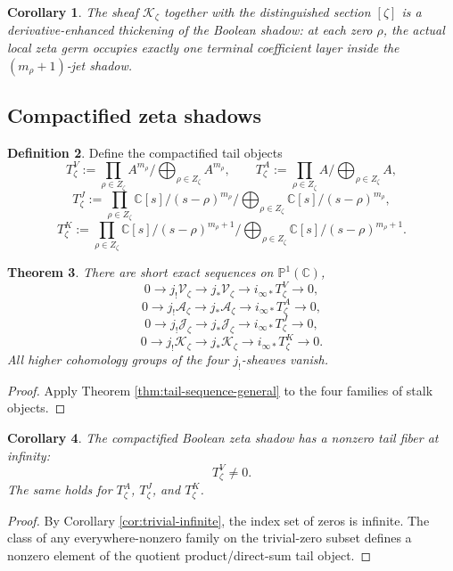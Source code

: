\documentclass[11pt,a4paper]{article}
\newtheorem{theorem}{Theorem}[section]
\newtheorem{corollary}[theorem]{Corollary}
\theoremstyle{definition}
\newtheorem{definition}[theorem]{Definition}
\theoremstyle{remark}
\newcommand{\CC}{\mathbb C}
\newcommand{\PP}{\mathbb P}
\newcommand{\Vzet}{\mathcal V_{\zeta}}
\newcommand{\Azet}{\mathcal A_{\zeta}}
\newcommand{\Jzet}{\mathcal J_{\zeta}}
\newcommand{\Kzet}{\mathcal K_{\zeta}}
\begin{document}
\begin{corollary}\label{cor:nonreduced-shadow}
The sheaf $\Kzet$ together with the distinguished section $[\zeta]$ is a derivative-enhanced thickening of the Boolean shadow: at each zero $\rho$, the actual local zeta germ occupies exactly one terminal coefficient layer inside the $(m_\rho+1)$-jet shadow.
\end{corollary}

\subsection{Compactified zeta shadows}

\begin{definition}
Define the compactified tail objects
\[
T_\zeta^{V}:=\prod_{\rho\in Z_\zeta}A^{m_\rho}\Big/\bigoplus_{\rho\in Z_\zeta}A^{m_\rho},
\qquad
T_\zeta^{A}:=\prod_{\rho\in Z_\zeta}A\Big/\bigoplus_{\rho\in Z_\zeta}A,
\]
\[
T_\zeta^{J}:=\prod_{\rho\in Z_\zeta}\CC[s]/(s-\rho)^{m_\rho}\Big/\bigoplus_{\rho\in Z_\zeta}\CC[s]/(s-\rho)^{m_\rho},
\]
\[
T_\zeta^{K}:=\prod_{\rho\in Z_\zeta}\CC[s]/(s-\rho)^{m_\rho+1}\Big/\bigoplus_{\rho\in Z_\zeta}\CC[s]/(s-\rho)^{m_\rho+1}.
\]
\end{definition}

\begin{theorem}\label{thm:compactified-zeta}
There are short exact sequences on $\PP^1(\CC)$,
\[
0\to j_!\Vzet\to j_*\Vzet\to i_{\infty *}T_\zeta^V\to0,
\]
\[
0\to j_!\Azet\to j_*\Azet\to i_{\infty *}T_\zeta^A\to0,
\]
\[
0\to j_!\Jzet\to j_*\Jzet\to i_{\infty *}T_\zeta^J\to0,
\]
\[
0\to j_!\Kzet\to j_*\Kzet\to i_{\infty *}T_\zeta^K\to0.
\]
All higher cohomology groups of the four $j_!$-sheaves vanish.
\end{theorem}

\begin{proof}
Apply Theorem \ref{thm:tail-sequence-general} to the four families of stalk objects.
\end{proof}

\begin{corollary}\label{cor:tail-nonzero}
The compactified Boolean zeta shadow has a nonzero tail fiber at infinity:
\[
T_\zeta^V\neq0.
\]
The same holds for $T_\zeta^A$, $T_\zeta^J$, and $T_\zeta^K$.
\end{corollary}

\begin{proof}
By Corollary \ref{cor:trivial-infinite}, the index set of zeros is infinite.  The class of any everywhere-nonzero family on the trivial-zero subset defines a nonzero element of the quotient product/direct-sum tail object.
\end{proof}
\end{document}
